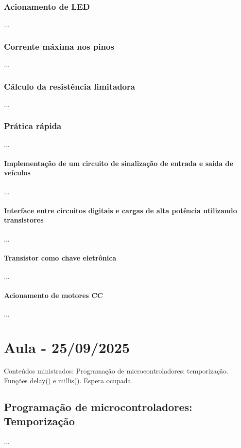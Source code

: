 \documentclass{article}
\begin{document}
\subsubsection{Acionamento de LED}
...

\subsubsection{Corrente máxima nos pinos}
...

\subsubsection{Cálculo da resistência limitadora}
...

\subsubsection{Prática rápida}
...

\paragraph{Implementação de um circuito de sinalização de entrada e saída de veículos}
...

\paragraph{Interface entre circuitos digitais e cargas de alta potência utilizando transistores}
...

\paragraph{Transistor como chave eletrônica}
...

\paragraph{Acionamento de motores CC}
...

\section{Aula - 25/09/2025}
Conteúdos ministrados:  Programação de microcontroladores: temporização. Funções delay() e millis(). Espera ocupada.

\subsection{Programação de microcontroladores: Temporização}
...
\end{document}
